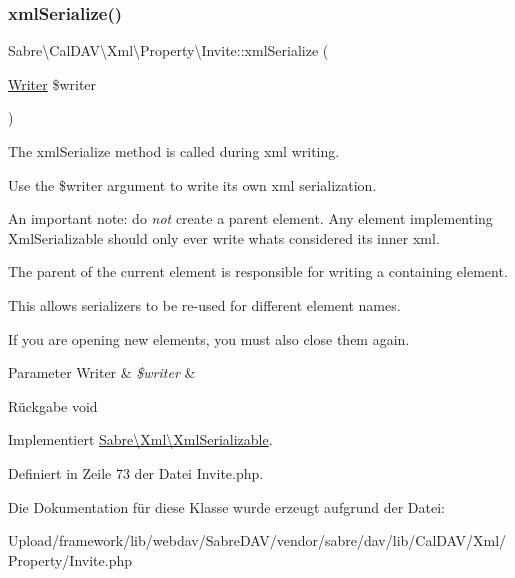\subsubsection{\texorpdfstring{xml\+Serialize()}{xmlSerialize()}}
{\footnotesize\ttfamily Sabre\textbackslash{}\+Cal\+D\+A\+V\textbackslash{}\+Xml\textbackslash{}\+Property\textbackslash{}\+Invite\+::xml\+Serialize (\begin{DoxyParamCaption}\item[{\mbox{\hyperlink{class_sabre_1_1_xml_1_1_writer}{Writer}}}]{\$writer }\end{DoxyParamCaption})}

The xml\+Serialize method is called during xml writing.

Use the \$writer argument to write its own xml serialization.

An important note\+: do {\itshape not} create a parent element. Any element implementing Xml\+Serializable should only ever write what\textquotesingle{}s considered its \textquotesingle{}inner xml\textquotesingle{}.

The parent of the current element is responsible for writing a containing element.

This allows serializers to be re-\/used for different element names.

If you are opening new elements, you must also close them again.


\begin{DoxyParams}[1]{Parameter}
Writer & {\em \$writer} & \\
\hline
\end{DoxyParams}
\begin{DoxyReturn}{Rückgabe}
void 
\end{DoxyReturn}


Implementiert \mbox{\hyperlink{interface_sabre_1_1_xml_1_1_xml_serializable_aa78f3ee43aa699be8347181653a53d8c}{Sabre\textbackslash{}\+Xml\textbackslash{}\+Xml\+Serializable}}.



Definiert in Zeile 73 der Datei Invite.\+php.



Die Dokumentation für diese Klasse wurde erzeugt aufgrund der Datei\+:\begin{DoxyCompactItemize}
\item 
Upload/framework/lib/webdav/\+Sabre\+D\+A\+V/vendor/sabre/dav/lib/\+Cal\+D\+A\+V/\+Xml/\+Property/Invite.\+php\end{DoxyCompactItemize}
